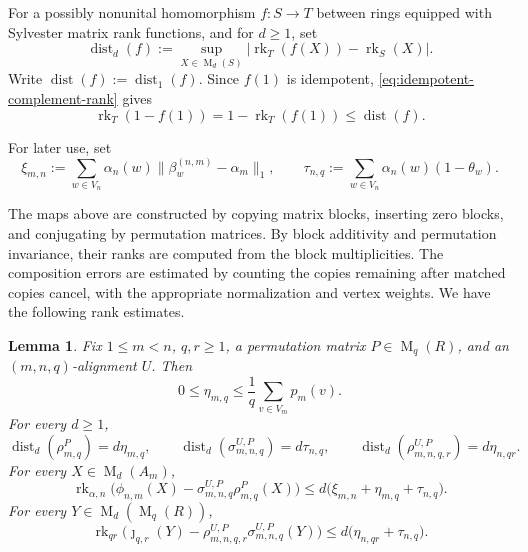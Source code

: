 \documentclass[11pt]{amsart}
\DeclareMathOperator{\rk}{rk}
\DeclareMathOperator{\Mat}{M}
\newtheorem{lemma}[theorem]{Lemma}
\theoremstyle{definition}
\theoremstyle{remark}
\begin{document}
For a possibly nonunital homomorphism $f\colon S\to T$
between rings equipped with Sylvester matrix rank functions, and for $d\geq1$, set
\begin{equation}\label{eq:rank-distortion}
 \operatorname{dist}_d(f)
 :=\sup_{X\in \Mat_d(S)}
 \bigl|\rk_T(f(X))-\rk_S(X)\bigr|.
\end{equation}
Write $\operatorname{dist}(f):=\operatorname{dist}_1(f)$.
Since $f(1)$ is idempotent, \eqref{eq:idempotent-complement-rank} gives
\begin{equation}\label{eq:identity-controlled-by-distortion}
 \rk_T(1-f(1))
 =1-\rk_T(f(1))
 \leq\operatorname{dist}(f).
\end{equation}

For later use, set
\begin{equation}\label{eq:finite-error-parameters}
 \xi_{m,n}
 :=\sum_{w\in V_n}\alpha_n(w)
   \|\beta_w^{(n,m)}-\alpha_m\|_1,
 \qquad
 \tau_{n,q}
 :=\sum_{w\in V_n}\alpha_n(w)(1-\theta_w).
\end{equation}

The maps above are constructed by copying matrix blocks, inserting zero blocks,
and conjugating by permutation matrices.
By block additivity and permutation invariance, their ranks are
computed from the block multiplicities.
The composition errors are
estimated by counting the copies remaining after matched copies
cancel, with the appropriate normalization and vertex weights.
We have the following rank estimates.

\begin{lemma}
\label{lem:finite-model-estimates}
Fix $1\leq m<n$, $q,r\geq1$, a permutation matrix $P\in\Mat_q(R)$, and an
$(m,n,q)$-alignment $U$.
Then
\begin{equation}\label{eq:eta}
 0\leq\eta_{m,q}\leq\frac1q\sum_{v\in V_m}p_m(v).
\end{equation}
For every $d\geq1$,
\begin{equation}\label{eq:amplified-eta}
 \operatorname{dist}_d(\rho_{m,q}^{P})=d\eta_{m,q},
 \qquad
 \operatorname{dist}_d(\sigma_{m,n,q}^{U,P})=d\tau_{n,q},
 \qquad
 \operatorname{dist}_d(\rho_{m,n,q,r}^{U,P})=d\eta_{n,qr}.
\end{equation}
For every $X\in\Mat_d(A_m)$,
\begin{equation}\label{eq:parameter-first-square}
 \rk_{\alpha,n}\bigl(
   \phi_{n,m}(X)-
   \sigma_{m,n,q}^{U,P}\rho_{m,q}^{P}(X)
 \bigr)
 \leq d\bigl(\xi_{m,n}+\eta_{m,q}+\tau_{n,q}\bigr).
\end{equation}
For every $Y\in\Mat_d(\Mat_q(R))$,
\begin{equation}
   \label{eq:parameter-second-square}
  \rk_{qr}\bigl(
   \jmath_{q,r}(Y)-
   \rho_{m,n,q,r}^{U,P}\sigma_{m,n,q}^{U,P}(Y)
 \bigr)
 \leq d\bigl(\eta_{n,qr}+\tau_{n,q}\bigr).
\end{equation}
\end{lemma}
\end{document}
